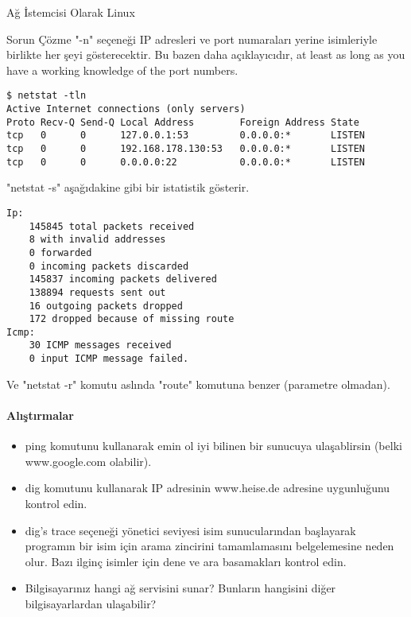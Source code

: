 \begin{section}{Ağ İstemcisi Olarak Linux}
\begin{subsection}{Sorun Çözme}
"-n" seçeneği IP adresleri ve port numaraları yerine isimleriyle birlikte her şeyi gösterecektir. Bu bazen daha açıklayıcıdır, at least as long as you have a working knowledge of the port numbers.

\begin{verbatim}
$ netstat -tln
Active Internet connections (only servers)
Proto Recv-Q Send-Q Local Address        Foreign Address State
tcp   0      0      127.0.0.1:53         0.0.0.0:*       LISTEN
tcp   0      0      192.168.178.130:53   0.0.0.0:*       LISTEN
tcp   0      0      0.0.0.0:22           0.0.0.0:*       LISTEN
\end{verbatim}

"netstat -s" aşağıdakine gibi bir istatistik gösterir.

\begin{verbatim}
Ip:
    145845 total packets received
    8 with invalid addresses
    0 forwarded
    0 incoming packets discarded
    145837 incoming packets delivered
    138894 requests sent out
    16 outgoing packets dropped
    172 dropped because of missing route
Icmp:
    30 ICMP messages received
    0 input ICMP message failed.
\end{verbatim}

Ve "netstat -r" komutu aslında "route" komutuna benzer (parametre olmadan).

\paragraph{Alıştırmalar}{
\begin{itemize}
 \item ping komutunu kullanarak emin ol iyi bilinen bir sunucuya ulaşablirsin (belki www.google.com olabilir).
 \item dig komutunu kullanarak IP adresinin www.heise.de adresine uygunluğunu kontrol edin.
 \item dig's trace seçeneği yönetici seviyesi isim sunucularından başlayarak programın bir isim için arama zincirini tamamlamasını belgelemesine neden olur. Bazı ilginç isimler için dene ve ara basamakları kontrol edin.
 \item Bilgisayarınız hangi ağ servisini sunar? Bunların hangisini diğer bilgisayarlardan ulaşabilir?
\end{itemize}}


\end{subsection}
\end{section}
